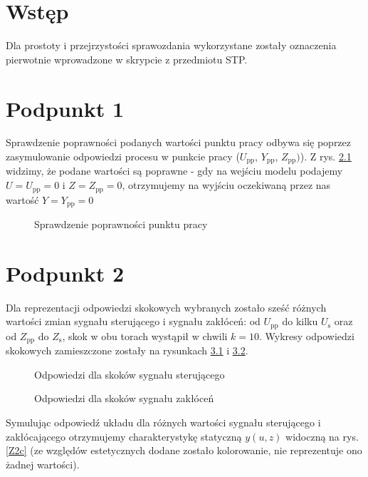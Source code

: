\chapter{Wstęp}
Dla prostoty i przejrzystości sprawozdania wykorzystane zostały oznaczenia pierwotnie wprowadzone w skrypcie z przedmiotu STP.

\chapter{Podpunkt 1}
Sprawdzenie poprawności podanych wartości punktu pracy odbywa się poprzez zasymulowanie odpowiedzi procesu w punkcie pracy ($U_{\mathrm{pp}}$, $Y_{\mathrm{pp}}$, $Z_{\mathrm{pp}})$). Z rys. \ref{Z1} widzimy, że podane wartości są poprawne - gdy na wejściu modelu podajemy $U=U_{\mathrm{pp}}=0$ i $Z=Z_{\mathrm{pp}}=\num{0}$, otrzymujemy na wyjściu oczekiwaną przez nas wartość $Y=Y_{\mathrm{pp}}=\num{0}$

\begin{figure}[ht]
\centering

\caption{Sprawdzenie poprawności punktu pracy}
\label{Z1}
\end{figure}


\chapter{Podpunkt 2}
Dla reprezentacji odpowiedzi skokowych wybranych zostało sześć różnych wartości zmian sygnału sterującego i sygnału zakłóceń: od $U_{\mathrm{pp}}$ do kilku $U_{\mathrm{s}}$ oraz od $Z_{\mathrm{pp}}$ do  $Z_{\mathrm{s}}$, skok w obu torach wystąpił w chwili $k=10$. Wykresy odpowiedzi skokowych zamieszczone zostały na rysunkach \ref{Z2a} i \ref{Z2b}.

\begin{figure}[ht]
\centering

\caption{Odpowiedzi dla skoków sygnału sterującego} 
\label{Z2a}
\end{figure}

\begin{figure}[ht]
\centering

\caption{Odpowiedzi dla skoków sygnału zakłóceń}
\label{Z2b}
\end{figure}

Symulując odpowiedź układu dla różnych wartości sygnału sterującego i zakłócającego otrzymujemy charakterystykę statyczną $y(u,z)$ widoczną na rys. \ref{Z2c} (ze względów estetycznych dodane zostało kolorowanie, nie reprezentuje ono żadnej wartości).

